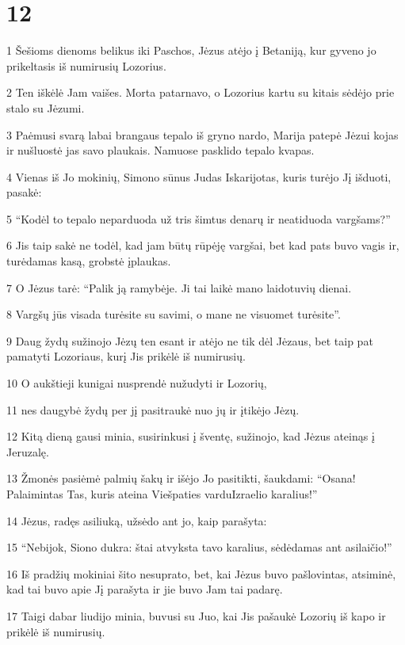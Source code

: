 \chapter{12}


\par 1 Šešioms dienoms belikus iki Paschos, Jėzus atėjo į Betaniją, kur gyveno jo prikeltasis iš numirusių Lozorius. 
\par 2 Ten iškėlė Jam vaišes. Morta patarnavo, o Lozorius kartu su kitais sėdėjo prie stalo su Jėzumi. 
\par 3 Paėmusi svarą labai brangaus tepalo iš gryno nardo, Marija patepė Jėzui kojas ir nušluostė jas savo plaukais. Namuose pasklido tepalo kvapas. 
\par 4 Vienas iš Jo mokinių, Simono sūnus Judas Iskarijotas, kuris turėjo Jį išduoti, pasakė: 
\par 5 “Kodėl to tepalo neparduoda už tris šimtus denarų ir neatiduoda vargšams?” 
\par 6 Jis taip sakė ne todėl, kad jam būtų rūpėję vargšai, bet kad pats buvo vagis ir, turėdamas kasą, grobstė įplaukas. 
\par 7 O Jėzus tarė: “Palik ją ramybėje. Ji tai laikė mano laidotuvių dienai. 
\par 8 Vargšų jūs visada turėsite su savimi, o mane ne visuomet turėsite”. 
\par 9 Daug žydų sužinojo Jėzų ten esant ir atėjo ne tik dėl Jėzaus, bet taip pat pamatyti Lozoriaus, kurį Jis prikėlė iš numirusių. 
\par 10 O aukštieji kunigai nusprendė nužudyti ir Lozorių, 
\par 11 nes daugybė žydų per jį pasitraukė nuo jų ir įtikėjo Jėzų. 
\par 12 Kitą dieną gausi minia, susirinkusi į šventę, sužinojo, kad Jėzus ateinąs į Jeruzalę. 
\par 13 Žmonės pasiėmė palmių šakų ir išėjo Jo pasitikti, šaukdami: “Osana! Palaimintas Tas, kuris ateina Viešpaties vardu­Izraelio karalius!” 
\par 14 Jėzus, radęs asiliuką, užsėdo ant jo, kaip parašyta: 
\par 15 “Nebijok, Siono dukra: štai atvyksta tavo karalius, sėdėdamas ant asilaičio!” 
\par 16 Iš pradžių mokiniai šito nesuprato, bet, kai Jėzus buvo pašlovintas, atsiminė, kad tai buvo apie Jį parašyta ir jie buvo Jam tai padarę. 
\par 17 Taigi dabar liudijo minia, buvusi su Juo, kai Jis pašaukė Lozorių iš kapo ir prikėlė iš numirusių. 
